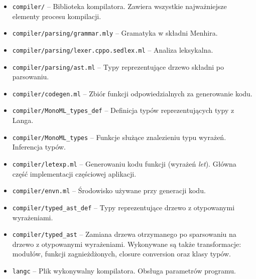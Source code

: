 \documentclass[declaration,shortabstract]{iithesis}
\begin{document}
\begin{itemize}
  \item \texttt{compiler/} -- Biblioteka kompilatora. Zawiera wszystkie 
  najważniejsze elementy procesu kompilacji.
  \item \texttt{compiler/parsing/grammar.mly} -- Gramatyka w składni Menhira.
  \item \texttt{compiler/parsing/lexer.cppo.sedlex.ml} -- Analiza leksykalna.
  \item \texttt{compiler/parsing/ast.ml} -- Typy reprezentujące drzewo składni 
  po parsowaniu.
  \item \texttt{compiler/codegen.ml} -- Zbiór funkcji odpowiedzialnych za 
  generowanie kodu.
  \item \texttt{compiler/MonoML\_types\_def} -- Definicja typów reprezentujących 
  typy z Langa.
  \item \texttt{compiler/MonoML\_types} -- Funkcje służące znalezieniu
  typu wyrażeń. Inferencja typów.
  \item \texttt{compiler/letexp.ml} -- Generowaniu kodu funkcji 
  (wyrażeń \textit{let}). 
  Główna część implementacji częściowej aplikacji.
  \item \texttt{compiler/envn.ml} -- Środowisko używane przy 
  generacji kodu.
  \item \texttt{compiler/typed\_ast\_def} -- Typy reprezentujące drzewo 
  z otypowanymi wyrażeniami.
  \item \texttt{compiler/typed\_ast} -- Zamiana drzewa otrzymanego po 
  sparsowaniu na \newline drzewo z otypowanymi wyrażeniami. Wykonywane są także 
  transformacje: modułów, funkcji zagnieżdżonych, closure conversion
  oraz klasy typów.
  \item \texttt{langc} -- Plik wykonywalny kompilatora. Obsługa 
  parametrów programu.

\end{itemize}

\end{document}
